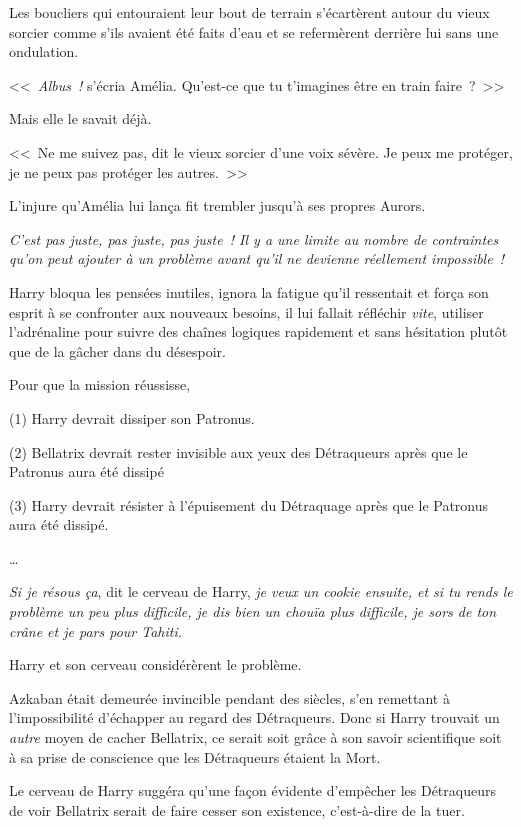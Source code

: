 Les boucliers qui entouraient leur bout de terrain s'écartèrent autour du vieux sorcier comme s'ils avaient été faits d'eau et se refermèrent derrière lui sans une ondulation.

<<~\emph{Albus~!} s'écria Amélia. Qu'est-ce que tu t'imagines être en train faire~?~>>

Mais elle le savait déjà.

<<~Ne me suivez pas, dit le vieux sorcier d'une voix sévère. Je peux me protéger, je ne peux pas protéger les autres.~>>

L'injure qu'Amélia lui lança fit trembler jusqu'à ses propres Aurors.

\later

\emph{C'est pas juste, pas juste, pas juste~! Il y a une limite au nombre de contraintes qu'on peut ajouter à un problème avant qu'il ne devienne réellement impossible~!}

Harry bloqua les pensées inutiles, ignora la fatigue qu'il ressentait et força son esprit à se confronter aux nouveaux besoins, il lui fallait réfléchir \emph{vite}, utiliser l'adrénaline pour suivre des chaînes logiques rapidement et sans hésitation plutôt que de la gâcher dans du désespoir.

Pour que la mission réussisse,

(1) Harry devrait dissiper son Patronus.

(2) Bellatrix devrait rester invisible aux yeux des Détraqueurs après que le Patronus aura été dissipé

(3) Harry devrait résister à l'épuisement du Détraquage après que le Patronus aura été dissipé.

…

\emph{Si je résous ça}, dit le cerveau de Harry, \emph{je veux un cookie ensuite, et si tu rends le problème un peu plus difficile, je dis bien un chouïa plus difficile, je sors de ton crâne et je pars pour Tahiti.}

Harry et son cerveau considérèrent le problème.

Azkaban était demeurée invincible pendant des siècles, s'en remettant à l'impossibilité d'échapper au regard des Détraqueurs. Donc si Harry trouvait un \emph{autre} moyen de cacher Bellatrix, ce serait soit grâce à son savoir scientifique soit à sa prise de conscience que les Détraqueurs étaient la Mort.

Le cerveau de Harry suggéra qu'une façon évidente d'empêcher les Détraqueurs de voir Bellatrix serait de faire cesser son existence, c'est-à-dire de la tuer.

